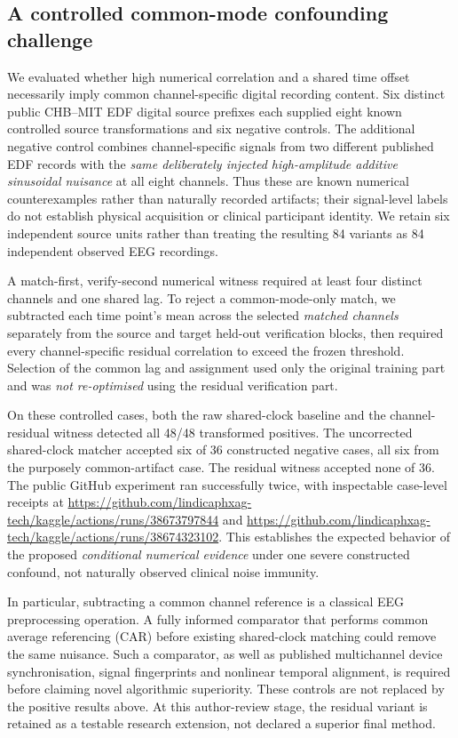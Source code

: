 \subsection{A controlled common-mode confounding challenge}
We evaluated whether high numerical correlation and a shared time
offset necessarily imply common channel-specific digital recording
content. Six distinct public CHB--MIT EDF digital source prefixes
each supplied eight known controlled source transformations and six
negative controls. The additional negative control combines
channel-specific signals from two different published EDF records
with the \emph{same deliberately injected high-amplitude additive
sinusoidal nuisance} at all eight channels. Thus these are known
numerical counterexamples rather than naturally recorded artifacts;
their signal-level labels do not establish physical acquisition or
clinical participant identity. We retain six independent source
units rather than treating the resulting 84 variants as
84 independent observed EEG recordings.

A match-first, verify-second numerical witness required at least
four distinct channels and one shared lag. To reject a common-mode-only
match, we subtracted each time point's mean across the selected
\emph{matched channels} separately from the source and target held-out
verification blocks, then required every channel-specific residual
correlation to exceed the frozen threshold. Selection of the common lag
and assignment used only the original training part and was
\emph{not re-optimised} using the residual verification part.

On these controlled cases, both the raw shared-clock baseline
and the channel-residual witness detected all 48/48 transformed
positives. The uncorrected shared-clock matcher accepted six
of 36 constructed negative cases, all six from the purposely
common-artifact case. The residual witness accepted none of 36.
The public GitHub experiment ran successfully twice, with inspectable
case-level receipts at
\url{https://github.com/lindicaphxag-tech/kaggle/actions/runs/38673797844}
and
\url{https://github.com/lindicaphxag-tech/kaggle/actions/runs/38674323102}.
This establishes the expected behavior of the proposed
\emph{conditional numerical evidence} under one severe constructed
confound, not naturally observed clinical noise immunity.

In particular, subtracting a common channel reference is a classical
EEG preprocessing operation. A fully informed comparator that performs
common average referencing (CAR) before existing shared-clock matching
could remove the same nuisance. Such a comparator, as well as published
multichannel device synchronisation, signal fingerprints and nonlinear
temporal alignment, is required before claiming novel algorithmic
superiority. These controls are not replaced by the positive results
above. At this author-review stage, the residual variant is retained as
a testable research extension, not declared a superior final method.
